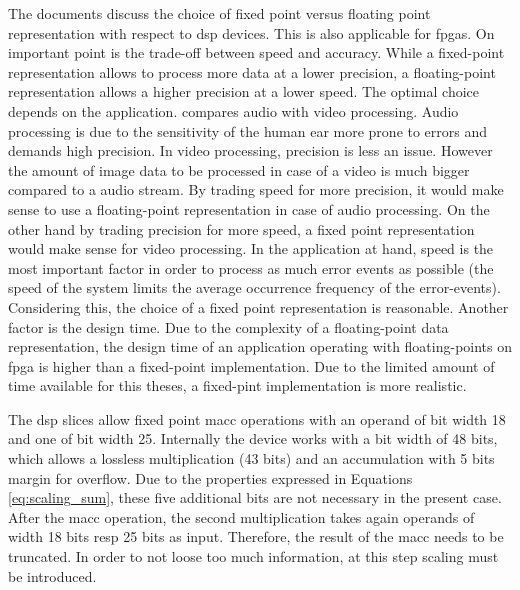 \documentclass[mscthesis]{usiinfthesis}
\begin{document}
The documents \cite{smith97, ti04} discuss the choice of fixed point versus
floating point representation with respect to \gls{dsp} devices. This is also
applicable for \glspl{fpga}. On important point is the trade-off between speed
and accuracy. While a fixed-point representation allows to process more data at
a lower precision, a floating-point representation allows a higher precision at
a lower speed. The optimal choice depends on the application.  \cite{ti04}
compares audio with video processing. Audio processing is due to the
sensitivity of the human ear more prone to errors and demands high precision.
In video processing, precision is less an issue. However the amount of image
data to be processed in case of a video is much bigger compared to a audio
stream. By trading speed for more precision, it would make sense to use
a floating-point representation in case of audio processing. On the other hand
by trading precision for more speed, a fixed point representation would make
sense for video processing. In the application at hand, speed is the most
important factor in order to process as much error events as possible (the
speed of the system limits the average occurrence frequency of the
error-events). Considering this, the choice of a fixed point representation is
reasonable. Another factor is the design time. Due to the complexity of
a floating-point data representation, the design time of an application
operating with floating-points on \gls{fpga} is higher than a fixed-point
implementation. Due to the limited amount of time available for this theses,
a fixed-pint implementation is more realistic.

The \gls{dsp} slices allow fixed point \gls{macc} operations with an operand of
bit width 18 and one of bit width 25. Internally the device works with a bit
width of 48 bits, which allows a lossless multiplication (43 bits) and an
accumulation with 5 bits margin for overflow. Due to the properties expressed
in Equations \ref{eq:scaling_sum}, these five additional bits are not necessary
in the present case. After the \gls{macc} operation, the second multiplication
takes again operands of width 18 bits resp 25 bits as input. Therefore, the
result of the \gls{macc} needs to be truncated. In order to not loose too much
information, at this step scaling must be introduced.
\end{document}
